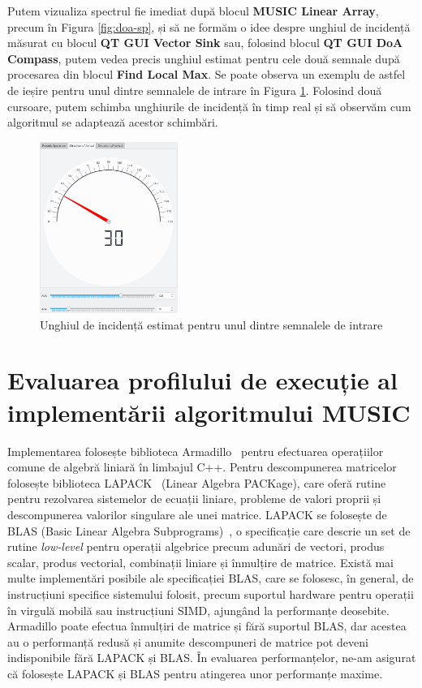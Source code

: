 Putem vizualiza spectrul fie imediat după blocul \textbf{MUSIC Linear
Array}, precum în Figura \ref{fig:doa-sp}, și să ne formăm o idee despre unghiul
de incidență măsurat cu blocul \textbf{QT GUI Vector Sink} sau, folosind blocul
\textbf{QT GUI DoA Compass}, putem vedea precis unghiul estimat pentru cele două
semnale după procesarea din blocul \textbf{Find Local Max}. Se poate observa un
exemplu de astfel de ieșire pentru unul dintre semnalele de intrare în Figura
\ref{fig:doa-compass}. Folosind două cursoare, putem schimba unghiurile de
incidență în timp real și să observăm cum algoritmul se adaptează acestor
schimbări. 

\begin{figure}[h]
    \centering
    \includegraphics[width=0.4\textwidth]{src/img/grc-doa-compass}
    \caption{Unghiul de incidență estimat pentru unul dintre semnalele de intrare}
    \label{fig:doa-compass}
\end{figure}

\section{Evaluarea profilului de execuție al implementării algoritmului MUSIC}
\label{sec:gr-doa-perf}

Implementarea  folosește biblioteca Armadillo~\cite{arma}
pentru efectuarea operațiilor comune de algebră liniară în limbajul C++. Pentru
descompunerea matricelor folosește biblioteca LAPACK~\cite{lapack} (Linear Algebra PACKage),
care oferă rutine pentru rezolvarea sistemelor de ecuații liniare, probleme de
valori proprii și descompunerea valorilor singulare ale unei matrice. 
LAPACK se folosește de BLAS (Basic Linear
Algebra Subprograms)~\cite{blas}, o specificație care descrie un set de rutine
\textit{low-level} pentru operații algebrice precum adunări de vectori, produs
scalar, produs vectorial, combinații liniare și înmulțire de matrice. Există mai
multe implementări posibile ale specificației BLAS, care se folosesc, în
general, de instrucțiuni specifice sistemului folosit, precum suportul hardware
pentru operații în virgulă mobilă sau instrucțiuni SIMD, ajungând la performanțe
deosebite. Armadillo poate efectua înmulțiri de matrice și fără suportul BLAS,
dar acestea au o performanță redusă și anumite descompuneri de matrice pot
deveni indisponibile fără LAPACK și BLAS. În evaluarea performanțelor, ne-am
asigurat că  folosește LAPACK și BLAS pentru atingerea unor
performanțe maxime.

